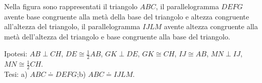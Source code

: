 Nella figura sono rappresentati il triangolo \(ABC\), il 
parallelogramma \(DEFG\) avente base congruente alla metà della base del 
triangolo e altezza congruente all'altezza del triangolo, il 
parallelogramma \(IJLM\) avente altezza congruente alla metà 
dell'altezza del triangolo e base congruente alla base del triangolo.

\noindent Ipotesi: \(AB\perp CH\), \(DE\cong \frac{1}{2}AB\), \(GK\perp 
DE\), \(GK\cong CH\), \(IJ\cong AB\), \(MN\perp IJ\), \(MN\cong 
\frac{1}{2}CH\).\\
Tesi: a) \(ABC\doteq DEFG\);\quad b) \(ABC\doteq IJLM\).

\begin{figure*}[!htb]
  \centering
\end{figure*}

